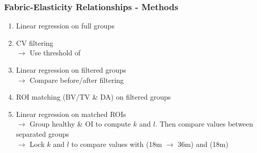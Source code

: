 \documentclass[xcolor=table]{beamer}
\begin{document}
\begin{frame}
	\frametitle{Fabric-Elasticity Relationships - Methods}
	\begin{enumerate}
		\item Linear regression on full groups\\
		\item CV filtering\\
				$\rightarrow$ Use threshold of \cite{p11}
		\item Linear regression on filtered groups\\
				$\rightarrow$ Compare before/after filtering
		\item ROI matching (BV/TV \& DA) on filtered groups
		\item Linear regression on matched ROIs\\
				$\rightarrow$ Group healthy \& OI to compute $k$ and $l$. Then compare values between separated groups\\
				$\rightarrow$ Lock $k$ and $l$ to compare values with \cite{p11} (18\si{\micro}m $\rightarrow$ 36\si{\micro}m) and \cite{p12} (18\si{\micro}m)
	\end{enumerate}
\end{frame}
\end{document}

